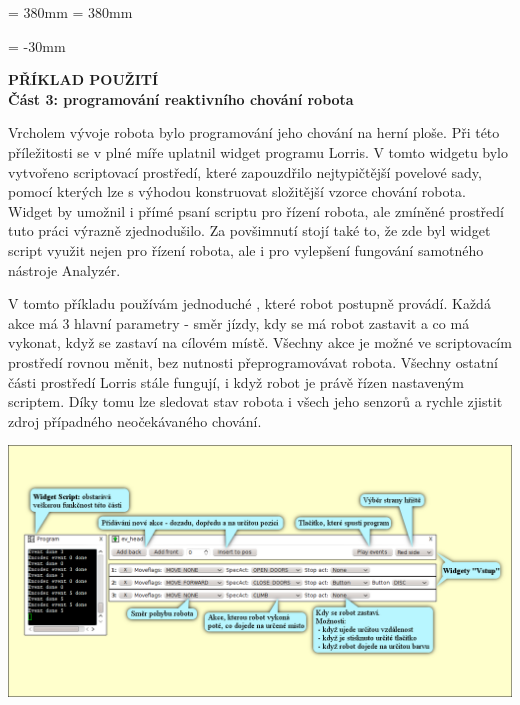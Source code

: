 \documentclass[17pt]{extreport}
\newcommand{\B}{\textbf} %
\begin{document}
\textheight = 380mm
\textwidth = 380mm
\newpage
\enlargethispage{400mm} %
\begin{landscape}
\voffset = -30mm %
\begin{center}
    \Large \B{PŘÍKLAD POUŽITÍ \\ Část 3: programování reaktivního chování robota}
\end{center}
\vspace{5mm}
Vrcholem vývoje robota bylo programování jeho chování na herní ploše. Při této příležitosti se v plné míře uplatnil widget  programu Lorris. V tomto widgetu bylo vytvořeno scriptovací prostředí, které zapouzdřilo nejtypičtější povelové sady, pomocí kterých lze s výhodou konstruovat složitější vzorce chování robota. Widget  by umožnil i přímé psaní scriptu pro řízení robota, ale zmíněné prostředí tuto práci výrazně zjednodušilo. Za povšimnutí stojí také to, že zde byl widget script využit nejen pro řízení robota, ale i pro vylepšení fungování samotného nástroje Analyzér.  
 
V tomto příkladu používám jednoduché , které robot postupně provádí. Každá akce má 3 hlavní parametry - směr jízdy, kdy se má robot zastavit a co má vykonat, když se zastaví na cílovém místě. Všechny akce je možné ve scriptovacím prostředí rovnou měnit, bez nutnosti přeprogramovávat robota. Všechny ostatní části prostředí Lorris stále fungují, i když robot je právě řízen nastaveným scriptem. Díky tomu lze sledovat stav robota i všech jeho senzorů a rychle zjistit zdroj případného neočekávaného chování. 
\begin{center}
\includegraphics{img/control2.png}
\end{center}
\end{landscape}
\end{document}
